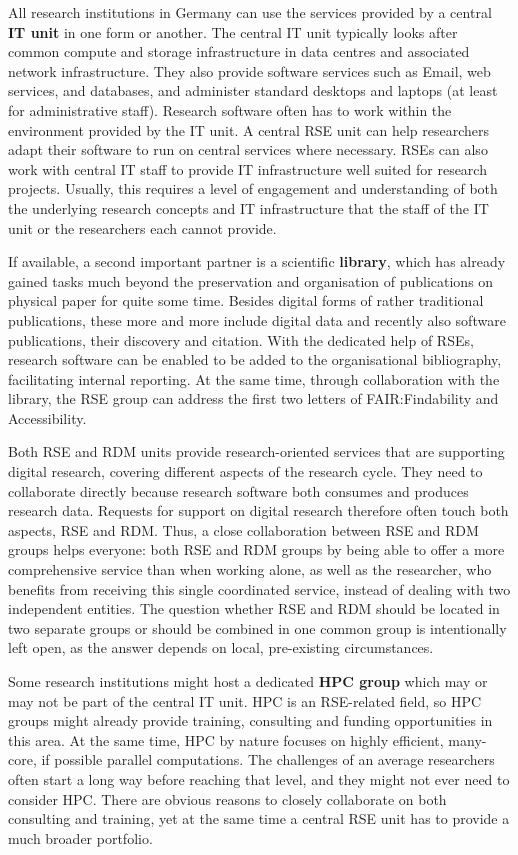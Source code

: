 \documentclass[a4paper]{article}
\begin{document}
All research institutions in Germany can use the services provided by a central \textbf{IT unit} in one form or another.
The central IT unit typically looks after common compute and storage infrastructure in data centres and associated network infrastructure.
They also provide software services such as Email, web services, and databases, and administer standard desktops and laptops (at least for administrative staff).
Research software often has to work within the environment provided by the IT unit.
A central RSE unit can help researchers adapt their software to run on central services where necessary.
RSEs can also work with central IT staff to provide IT infrastructure well suited for research projects.
Usually, this requires a level of engagement and understanding of both the underlying research concepts and IT infrastructure that the staff of the IT unit or the researchers each cannot provide.

If available, a second important partner is a scientific \textbf{library}, which has already gained tasks much beyond the preservation and organisation of publications on physical paper for quite some time.
Besides digital forms of rather traditional publications, these more and more include digital data and recently also software publications, their discovery and citation.
With the dedicated help of RSEs, research software can be enabled to be added to the organisational bibliography, facilitating internal reporting.
At the same time, through collaboration with the library, the RSE group can address the first two letters of FAIR:\@ Findability and Accessibility.

Both RSE and RDM units provide research-oriented services that are supporting digital research, covering different aspects of the research cycle.
They need to collaborate directly because research software both consumes and produces research data.
Requests for support on digital research therefore often touch both aspects, RSE and RDM\@.
Thus, a close collaboration between RSE and RDM groups helps everyone: both RSE and RDM groups by being able to offer a more comprehensive service than when working alone, as well as the researcher, who benefits from receiving this single coordinated service, instead of dealing with two independent entities.
The question whether RSE and RDM should be located in two separate groups or should be combined in one common group is intentionally left open, as the answer depends on local, pre-existing circumstances.

Some research institutions might host a dedicated \textbf{HPC group} which may or may not be part of the central IT unit.
HPC is an RSE-related field, so HPC groups might already provide training, consulting and funding opportunities in this area.
At the same time, HPC by nature focuses on highly efficient, many-core, if possible parallel computations.
The challenges of an average researchers often start a long way before reaching that level, and they might not ever need to consider HPC\@.
There are obvious reasons to closely collaborate on both consulting and training, yet at the same time a central RSE unit has to provide a much broader portfolio.
\end{document}
